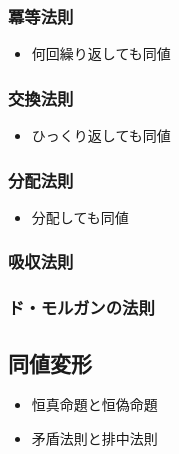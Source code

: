 \documentclass[../../imaging-math]{subfiles}
\begin{document}
\subsubsection{冪等法則}

\begin{mindflow}
  \begin{itemize}
    \item 何回繰り返しても同値
  \end{itemize}
\end{mindflow}

\subsubsection{交換法則}

\begin{mindflow}
  \begin{itemize}
    \item ひっくり返しても同値
  \end{itemize}
\end{mindflow}

\subsubsection{分配法則}

\begin{mindflow}
  \begin{itemize}
    \item 分配しても同値
  \end{itemize}
\end{mindflow}

\subsubsection{吸収法則}

\subsubsection{ド・モルガンの法則}

\subsection{同値変形}

\begin{mindflow}
  \begin{itemize}
    \item 恒真命題と恒偽命題
    \item 矛盾法則と排中法則
  \end{itemize}
\end{mindflow}
\end{document}
